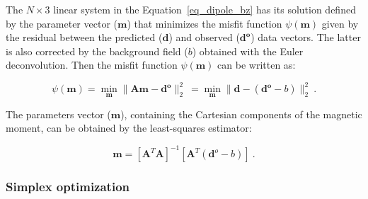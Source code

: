 
    The $N \times 3$ linear system in the Equation~\ref{eq_dipole_bz} has its solution defined by the parameter vector ($\mathbf{m}$) that minimizes the misfit function $\psi(\mathbf{m})$ given by the residual between the predicted ($\mathbf{\mathbf{d}}$) and observed ($\mathbf{\mathbf{d}^o}$) data vectors. The latter is also corrected by the background field ($b$) obtained with the Euler deconvolution. Then the misfit function $\psi(\mathbf{m})$ can be written as:
   
    \begin{equation}
    \label{psi_function}
    \psi(\mathbf{m}) = \min_{\mathbf{m}} \| \mathbf{A}\mathbf{m} - \mathbf{\mathbf{d}^o} \|_2^2\ = \min_{\mathbf{m}} \| \mathbf{d} - (\mathbf{\mathbf{d}^o}-b) \|_2^2\
    .
    \end{equation}

    The parameters vector ($\mathbf{m}$), containing the Cartesian components of the magnetic moment, can be obtained by the least-squares estimator:

    \begin{equation}
    \label{dipole_moment_solution}
    \mathbf{m} = {[\mathbf{A}^T \mathbf{A}]}^{-1} [\mathbf{A}^T (\mathbf{d}^o - b)]\ .
    \end{equation}
        
\subsubsection{Simplex optimization} 

